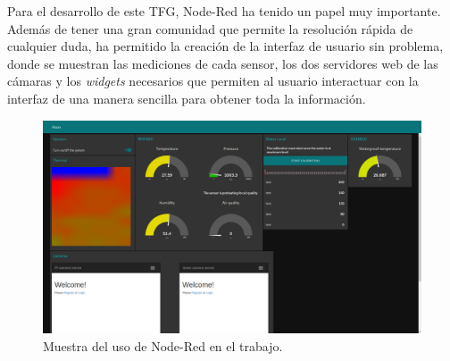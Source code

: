 \newpage
Para el desarrollo de este TFG, Node-Red ha tenido un papel muy importante. Además de tener una gran comunidad que permite la resolución rápida de cualquier duda, ha permitido la creación de la interfaz de usuario sin problema, donde se muestran las mediciones de cada sensor, los dos servidores web de las cámaras y los \textit{widgets} necesarios que permiten al usuario interactuar con la interfaz de una manera sencilla para obtener toda la información.\\
\begin{figure} [h!]
  \begin{center}
    \includegraphics[width=15cm]{figs/interfaz}
  \end{center}
  \caption{Muestra del uso de Node-Red en el trabajo.}
  \label{fig:node-imagenes}
\end{figure}


